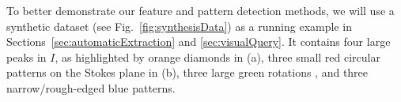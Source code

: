To better demonstrate our feature and pattern detection methods, we will use a synthetic dataset (see Fig.~\ref{fig:synthesisData}) as a running example in Sections~\ref{sec:automaticExtraction} and \ref{sec:visualQuery}.
It contains four large peaks in $I$, as highlighted by orange diamonds in (a), three small red circular patterns on the Stokes plane in (b), three large green rotations , and three narrow/rough-edged blue patterns.




